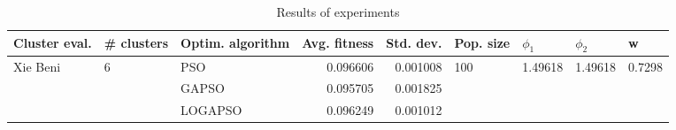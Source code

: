 \begin{table}
\centering
\caption{Results of experiments}
\begin{tabular}{lllrrllll}
\toprule
            Cluster eval. &        \# clusters & Optim. algorithm &  Avg. fitness &  Std. dev. &            Pop. size &               $\phi_{1}$ &               $\phi_{2}$ &                       w \\
\midrule
\multirow{3}{*}{Xie Beni} & \multirow{3}{*}{6} &              PSO &      0.096606 &   0.001008 & \multirow{3}{*}{100} & \multirow{3}{*}{1.49618} & \multirow{3}{*}{1.49618} & \multirow{3}{*}{0.7298} \\
                          &                    &            GAPSO &      0.095705 &   0.001825 &                      &                          &                          &                         \\
                          &                    &          LOGAPSO &      0.096249 &   0.001012 &                      &                          &                          &                         \\
\bottomrule
\end{tabular}
\end{table}
